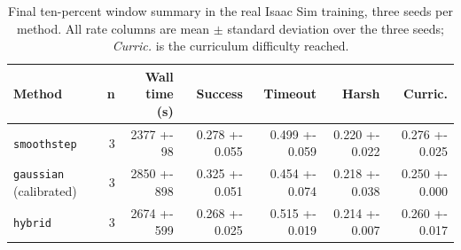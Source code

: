 \begin{table}[htb]
\centering
\caption{Final ten-percent window summary in the real Isaac Sim training, three seeds per method. All rate columns are mean $\pm$ standard deviation over the three seeds; \emph{Curric.} is the curriculum difficulty reached.}
\label{tab:rlsummary}
\footnotesize
\setlength{\tabcolsep}{3pt}
\begin{tabular}{@{}lrrrrrr@{}}
\toprule
Method & n & Wall time (s) & Success & Timeout & Harsh & Curric. \\
\midrule
\texttt{smoothstep} & 3 & 2377 +- 98 & 0.278 +- 0.055 & 0.499 +- 0.059 & 0.220 +- 0.022 & 0.276 +- 0.025 \\
\texttt{gaussian} (calibrated) & 3 & 2850 +- 898 & 0.325 +- 0.051 & 0.454 +- 0.074 & 0.218 +- 0.038 & 0.250 +- 0.000 \\
\texttt{hybrid} & 3 & 2674 +- 599 & 0.268 +- 0.025 & 0.515 +- 0.019 & 0.214 +- 0.007 & 0.260 +- 0.017 \\
\bottomrule
\end{tabular}
\end{table}
